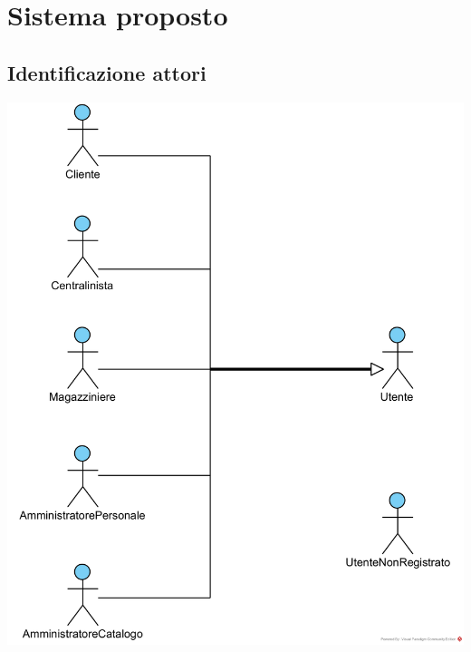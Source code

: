 \documentclass[12pt]{article}
\begin{document}
\section{Sistema proposto}
 
\subsection{Identificazione attori}
\begin{center}
\includegraphics[width=\textwidth]{IdentificazioneAttori}
\end{center}
 
\end{document}
